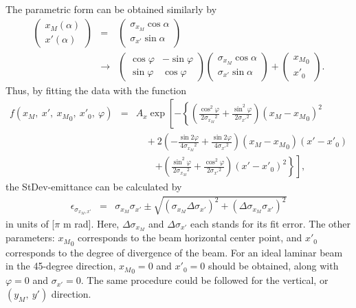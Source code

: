 \documentclass{article}
\begin{document}
The parametric form can be obtained similarly by
\begin{eqnarray*}
\left(
\begin{array}{c}
	x_M (\alpha) \\
	x' (\alpha)
\end{array} \right) & = & \left(
\begin{array}{c}
	\sigma_{x_M} \cos{\alpha} \\
	\sigma_{x'} \sin{\alpha}
\end{array} \right) \\
& \rightarrow & \left(
\begin{array}{cc}
	\cos{\varphi} & -\sin{\varphi} \\
	\sin{\varphi} & \cos{\varphi}
\end{array} \right) \left(
\begin{array}{c}
	\sigma_{x_M} \cos{\alpha} \\
	\sigma_{x'} \sin{\alpha}
\end{array} \right) + \left(
\begin{array}{c}
	{x_M}_0 \\
	{x'}_0
\end{array} \right).
\end{eqnarray*}
Thus, by fitting the data with the function 
\begin{eqnarray*}
f\left(x_M,\ x',\ {x_M}_0,\ {x'}_0,\ \varphi\right) & = & A_x \exp \left[ -\left\{ \left( \frac{\cos^2{\varphi}}{2{\sigma_{x_M}}^2} + \frac{\sin^2{\varphi}}{2{\sigma_{x'}}^2} \right) \left( x_M-{x_M}_0 \right)^2 \right. \right. \\
& & \, \, \, \, \, \, + 2 \left( -\frac{\sin{2\varphi}}{4{\sigma_{x_M}}^2} + \frac{\sin{2\varphi}}{4{\sigma_{x'}}^2} \right) \left( x_M-{x_M}_0 \right) \left( x'-{x'}_0 \right) \\
& & \, \, \, \, \, \, \, \, \, \, \, \, \left. \left. + \left( \frac{\sin^2{\varphi}}{2{\sigma_{x_M}}^2} + \frac{\cos^2{\varphi}}{2{\sigma_{x'}}^2} \right) \left( x'-{x'}_0 \right)^2 \right\} \right],
\end{eqnarray*}
the StDev-emittance can be calculated by
\begin{eqnarray*}
\epsilon_{\sigma_{x_M,x'}} & = & \sigma_{x_M} \sigma_{x'} \pm \sqrt{\left( \sigma_{x_M} \Delta \sigma_{x'} \right)^2 + \left( \Delta \sigma_{x_M} \sigma_{x'}  \right)^2 }
\end{eqnarray*}
in units of [$\pi$ m rad]. Here, $\Delta \sigma_{x_M}$ and $\Delta \sigma_{x'}$ each stands for its fit error. The other parameters: ${x_M}_0$ corresponds to the beam horizontal center point, and ${x'}_0$ corresponds to the degree of divergence of the beam. For an ideal laminar beam in the 45-degree direction, ${x_M}_0 = 0$ and ${x'}_0 = 0$ should be obtained, along with $\varphi = 0$ and $\sigma_{x'} = 0$. The same procedure could be followed for the vertical, or $\left(y_M,\ y'\right)$ direction.
\end{document}
